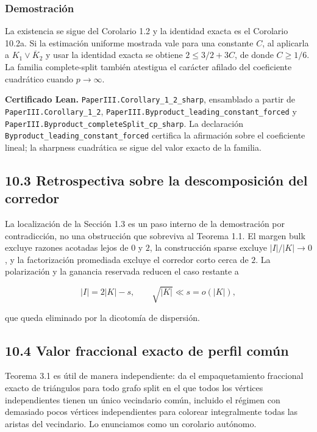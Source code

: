 \documentclass[
  spanish,
  11pt,
  a4paper,
]{article}
\begin{document}
\subsubsection{Demostración}\label{demostraciuxf3n-7}

La existencia se sigue del Corolario 1.2 y la identidad exacta es el Corolario 10.2a. Si la estimación uniforme mostrada vale para una constante \(C\), al aplicarla a \(K_1\vee\overline K_2\) y usar la identidad exacta se obtiene \(2\le3/2+3C\), de donde \(C\ge1/6\). La familia complete-split también atestigua el carácter afilado del coeficiente cuadrático cuando \(p\to\infty\).

\textbf{Certificado Lean.} \texttt{PaperIII.Corollary\_1\_2\_sharp}, ensamblado a partir de \texttt{PaperIII.Corollary\_1\_2}, \texttt{PaperIII.Byproduct\_leading\_constant\_forced} y \texttt{PaperIII.Byproduct\_completeSplit\_cp\_sharp}. La declaración \texttt{Byproduct\_leading\_constant\_forced} certifica la afirmación sobre el coeficiente lineal; la sharpness cuadrática se sigue del valor exacto de la familia.

\subsection{10.3 Retrospectiva sobre la descomposición del corredor}\label{retrospectiva-sobre-la-descomposiciuxf3n-del-corredor}

La localización de la Sección 1.3 es un paso interno de la demostración por contradicción, no una obstrucción que sobreviva al Teorema 1.1. El margen bulk excluye razones acotadas lejos de \(0\) y \(2\), la construcción sparse excluye \(|I|/|K|\to0\), y la factorización promediada excluye el corredor corto cerca de \(2\). La polarización y la ganancia reservada reducen el caso restante a

\[
|I|=2|K|-s,
\qquad
\sqrt{|K|}\ll s=o(|K|),
\]

que queda eliminado por la dicotomía de dispersión.

\subsection{10.4 Valor fraccional exacto de perfil común}\label{valor-fraccional-exacto-de-perfil-comuxfan}

Teorema 3.1 es útil de manera independiente: da el empaquetamiento fraccional exacto de triángulos para todo grafo split en el que todos los vértices independientes tienen un único vecindario común, incluido el régimen con demasiado pocos vértices independientes para colorear integralmente todas las aristas del vecindario. Lo enunciamos como un corolario autónomo.
\end{document}
